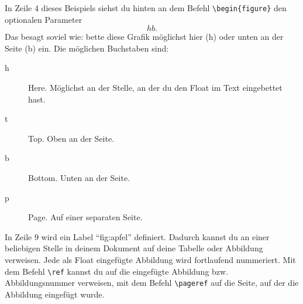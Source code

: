 In Zeile 4 dieses Beispiels siehst du hinten an dem Befehl \texttt{\textbackslash begin\{figure\}} den optionalen Parameter \texttt{\[hb.\]} Das besagt soviel wie: bette diese Grafik möglichst hier (h) oder unten an der Seite (b) ein. Die möglichen Buchstaben sind:

\begin{description}
\item[h] Here. Möglichst an der Stelle, an der du den Float im Text eingebettet hast.
\item[t] Top. Oben an der Seite.
\item[b] Bottom. Unten an der Seite.
\item[p] Page. Auf einer separaten Seite.
\end{description}

In Zeile 9 wird ein Label \enquote{fig:apfel} definiert. Dadurch kannst du an einer beliebigen Stelle in deinem Dokument auf deine Tabelle oder Abbildung verweisen. Jede als Float eingefügte Abbildung wird fortlaufend nummeriert. Mit dem Befehl \texttt{\textbackslash ref} kannst du auf die eingefügte Abbildung bzw. Abbildungsnummer verweisen, mit dem Befehl \texttt{\textbackslash pageref} auf die Seite, auf der die Abbildung eingefügt wurde.








